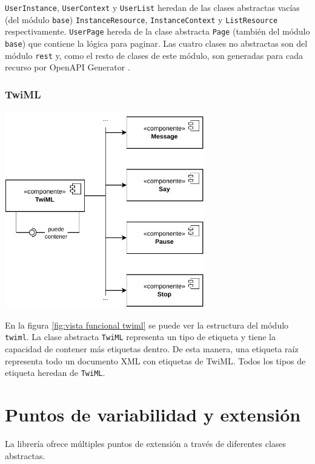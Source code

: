 \documentclass{article}
\begin{document}
\verb|UserInstance|, \verb|UserContext| y \verb|UserList|
heredan de las clases abstractas vacías
(del módulo \verb|base|)
\verb|InstanceResource|, \verb|InstanceContext| y \verb|ListResource|
respectivamente.
\verb|UserPage| hereda de la clase abstracta
\verb|Page| (también del módulo \verb|base|)
que contiene la lógica para paginar.
Las cuatro clases no abstractas son del módulo \verb|rest|
y, como el resto de clases de este módulo,
son generadas para cada recurso por OpenAPI Generator
\cite{twilio-generated-openapi}.

\subsubsection{TwiML}

\begin{center}
  \includegraphics[width=0.65\textwidth]{VistaFuncionalTwiML.pdf}
  \label{fig:vista funcional twiml}
\end{center}

En la figura \ref{fig:vista funcional twiml}
se puede ver la estructura del módulo \verb|twiml|.
La clase abstracta \verb|TwiML| representa un tipo de etiqueta
y tiene la capacidad de contener más etiquetas dentro.
De esta manera, una etiqueta raíz
representa todo un documento XML con etiquetas de TwiML.
Todos los tipos de etiqueta heredan de \verb|TwiML|.



\section{Puntos de variabilidad y extensión}

La librería ofrece múltiples puntos de extensión
a través de diferentes clases abstractas.
\end{document}
